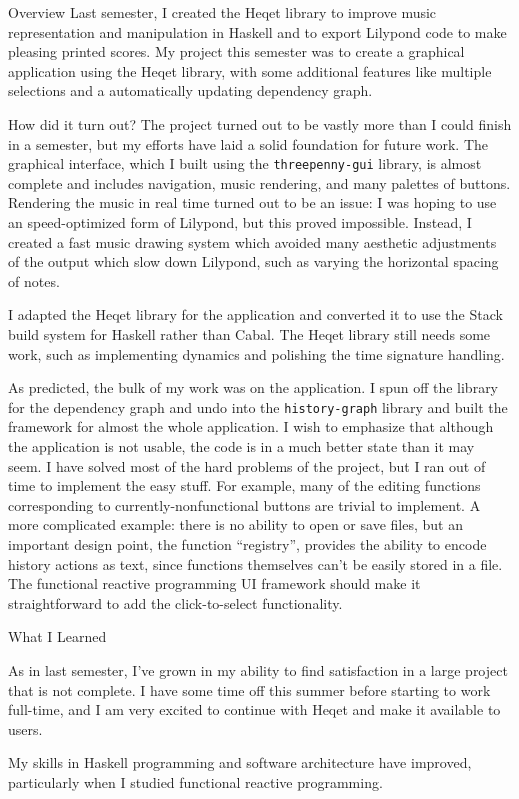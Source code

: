 \documentclass{article}
\begin{document}
\begin{section}{Overview}
Last semester, I created the Heqet library to improve music representation and manipulation in Haskell and to export Lilypond code to make pleasing printed scores. My project this semester was to create a graphical application using the Heqet library, with some additional features like multiple selections and a automatically updating dependency graph. 

\end{section}
\begin{section}{How did it turn out?}
The project turned out to be vastly more than I could finish in a semester, but my efforts have laid a solid foundation for future work. The graphical interface, which I built using the \texttt{threepenny-gui} library, is almost complete and includes navigation, music rendering, and many palettes of buttons. Rendering the music in real time turned out to be an issue: I was hoping to use an speed-optimized form of Lilypond, but this proved impossible. Instead, I created a fast music drawing system which avoided many aesthetic adjustments of the output which slow down Lilypond, such as varying the horizontal spacing of notes.

I adapted the Heqet library for the application and converted it to use the Stack build system for Haskell rather than Cabal. The Heqet library still needs some work, such as implementing dynamics and polishing the time signature handling.

As predicted, the bulk of my work was on the application. I spun off the library for the dependency graph and undo into the \texttt{history-graph} library and built the framework for almost the whole application. I wish to emphasize that although the application is not usable, the code is in a much better state than it may seem. I have solved most of the hard problems of the project, but I ran out of time to implement the easy stuff. For example, many of the editing functions corresponding to currently-nonfunctional buttons are trivial to implement. A more complicated example: there is no ability to open or save files, but an important design point, the function ``registry'', provides the ability to encode history actions as text, since functions themselves can't be easily stored in a file. The functional reactive programming UI framework should make it straightforward to add the click-to-select functionality.

\end{section}
\begin{section}{What I Learned}

As in last semester, I've grown in my ability to find satisfaction in a large project that is not complete. I have some time off this summer before starting to work full-time, and I am very excited to continue with Heqet and make it available to users.

My skills in Haskell programming and software architecture have improved, particularly when I studied functional reactive programming.

\end{section}
\end{document}
